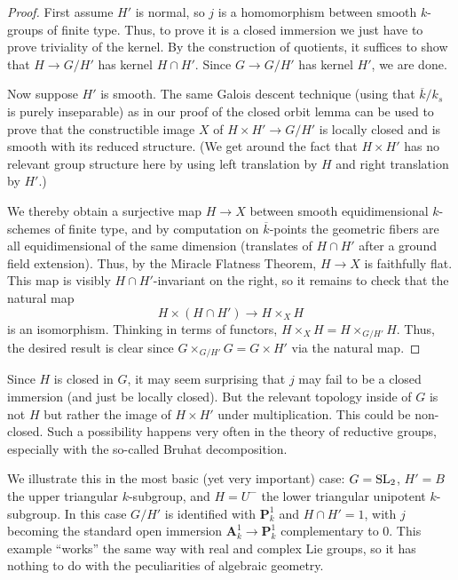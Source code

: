 \documentclass[10pt]{article}
\renewcommand{\(}{\left(}
\renewcommand{\)}{\right)}
\numberwithin{thm}{subsection}
\begin{document}
\begin{proof}
First assume $H'$ is normal, so $j$ is a homomorphism between smooth $k$-groups of
finite type. Thus, to prove it is a closed immersion we just have to prove triviality of the kernel.
By the construction of quotients, it suffices to show that $H \rightarrow G/H'$ has kernel
$H \cap H'$.  Since $G \rightarrow G/H'$ has kernel $H'$, we are done. 

Now suppose $H'$ is smooth.
The same Galois descent technique (using that $\overline{k}/k_s$ is purely
inseparable) as in our proof of the closed orbit lemma
can be used to prove that the constructible image $X$ of
$H \times H' \rightarrow G/H'$ is locally closed and is smooth with
its reduced structure.  (We get around the fact that $H \times H'$ has
no relevant group structure here by using left translation by $H$ and
right translation by $H'$.) 

We thereby obtain a surjective map $H \rightarrow X$
between smooth equidimensional $k$-schemes of finite type, and by computation
on $\overline{k}$-points the geometric fibers are all equidimensional of the same dimension
(translates of $H \cap H'$ after a ground field extension).   Thus,
by the Miracle Flatness Theorem, $H \rightarrow X$ is faithfully flat. 
This map is visibly $H \cap H'$-invariant on the right, so it remains to check that 
the natural map 
$$H \times (H \cap H') \rightarrow H \times_{X} H$$
is an isomorphism.  
Thinking in terms of functors, $H \times_X H = H \times_{G/H'} H$.  Thus, the desired
result is clear since $G \times_{G/H'} G = G \times H'$ via the natural map. 
\end{proof}

\begin{example}
Since $H$ is closed in $G$, it may seem surprising that $j$ may fail to be a closed immersion
(and just be locally closed).  But the relevant topology inside of $G$ is not $H$ but
rather the image of $H \times H'$ under multiplication.  This could be non-closed.
Such a possibility happens very often in the theory of reductive groups, especially
with the so-called Bruhat decomposition.  

We illustrate this in the most basic (yet very important) case:  $G = {\rm{SL}}_2$,
$H' = B$ the upper triangular $k$-subgroup, and $H = U^{-}$ the lower triangular
unipotent $k$-subgroup.   In this case $G/H'$ is identified with 
$\mathbf{P}^1_k$ and $H \cap H' = 1$, with $j$ becoming the standard open immersion 
$\mathbf{A}^1_k \rightarrow \mathbf{P}^1_k$ complementary to $0$.
This example ``works'' the same way with real and complex Lie groups,
so it has nothing to do with the peculiarities of algebraic geometry. 
\end{example}
\end{document}
